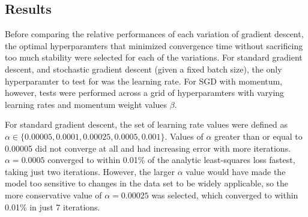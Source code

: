 \documentclass{article}
\begin{document}
\subsection{Results}
Before comparing the relative performances of each variation of gradient descent, the optimal hyperparamters that minimized convergence time without sacrificing too much stability were selected for each of the variations. For standard gradient descent, and stochastic gradient descent (given a fixed batch size), the only hyperparamter to test for was the learning rate. For SGD with momentum, however, tests were performed across a grid of hyperparamters with varying learning rates and momentum weight values $\beta$.

For standard gradient descent, the set of learning rate values were defined as $\alpha \in \{0.00005, 0.0001, 0.00025, 0.0005, 0.001\}$. Values of $\alpha$ greater than or equal to 0.00005 did not converge at all and had increasing error with more iterations. $\alpha = 0.0005$ converged to within 0.01\% of the analytic least-squares loss fastest, taking just two iterations. However, the larger $\alpha$ value would have made the model too sensitive to changes in the data set to be widely applicable, so the more conservative value of $\alpha = 0.00025$ was selected, which converged to within 0.01\% in just 7 iterations.
\end{document}

